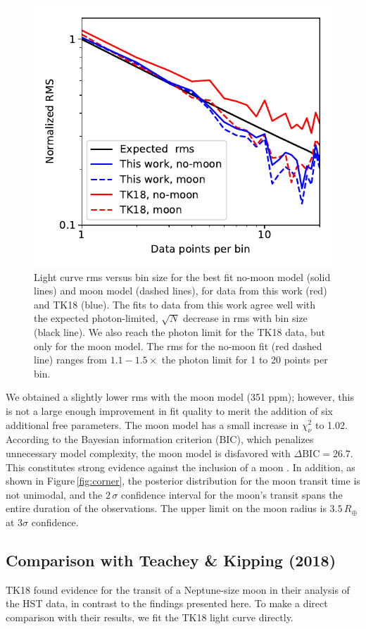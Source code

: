 \documentclass[twocolumn]{aastex62}
\begin{document}
\begin{figure}
\includegraphics[width = 0.5 \textwidth]{figures/fig2_rms.pdf}
    \caption{Light curve rms versus bin size for the best fit no-moon model (solid lines) and moon model (dashed lines), for data from this work (red) and TK18 (blue). The fits to data from this work agree well with the expected photon-limited, $\sqrt{N}$ decrease in rms with bin size (black line).  We also reach the photon limit for the TK18 data, but only for the moon model. The rms for the no-moon fit (red dashed line) ranges from $1.1 - 1.5\times$ the photon limit for 1 to 20 points per bin.}
 \label{fig:rms}
\end{figure}

We obtained a slightly lower rms with the moon model (351 ppm); however, this is not a large enough improvement in fit quality to merit the addition of six additional free parameters.  The moon model has a small increase in $\chi^2_\nu$ to 1.02. According to the Bayesian information criterion (BIC), which penalizes unnecessary model complexity, the moon model is disfavored with $\Delta\mathrm{BIC} = 26.7$. This constitutes strong evidence against the inclusion of a moon \citep{kass95}.  In addition, as shown in Figure\,\ref{fig:corner}, the posterior distribution for the moon transit time is not unimodal, and the $2\,\sigma$ confidence interval for the moon's transit spans the entire duration of the observations.  The upper limit on the moon radius is $3.5\,R_\oplus$ at $3\sigma$ confidence.



\subsection{Comparison with Teachey \& Kipping (2018)}
TK18 found evidence for the transit of a Neptune-size moon in their analysis of the HST data, in contrast to the findings presented here.  To make a direct comparison with their results, we fit the TK18 light curve directly. 
\end{document}

